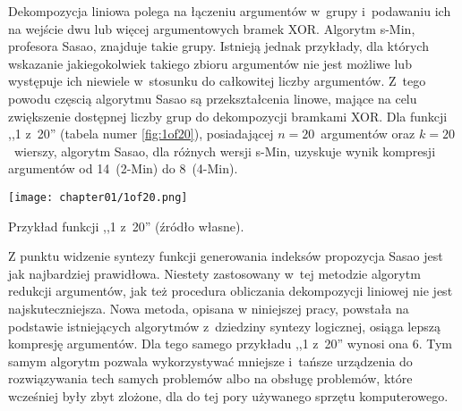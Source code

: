 Dekompozycja liniowa polega na łączeniu argumentów w~grupy i~podawaniu ich na wejście dwu lub więcej argumentowych bramek XOR.
Algorytm s-Min, profesora Sasao, znajduje takie grupy.
Istnieją jednak przykłady,
dla których wskazanie jakiegokolwiek takiego zbioru argumentów nie jest możliwe lub występuje ich niewiele w~stosunku do całkowitej liczby argumentów.
Z~tego powodu częscią algorytmu Sasao są przekształcenia linowe,
mające na celu zwiększenie dostępnej liczby grup do dekompozycji bramkami XOR.
Dla funkcji ,,1 z~20'' (tabela numer \ref{fig:1of20}),
posiadającej $n=20$~argumentów oraz $k=20$~wierszy,
algorytm Sasao,
dla różnych wersji s-Min,
uzyskuje wynik kompresji argumentów od 14~(2-Min) do 8~(4-Min).

\begin{table}
\centering
\texttt{[image: chapter01/1of20.png]}
\caption{Przykład funkcji ,,1 z~20'' (źródło własne).}
\label{fig:1of20}
\end{table}

Z punktu widzenie syntezy funkcji generowania indeksów propozycja Sasao jest jak najbardziej prawidłowa.
Niestety zastosowany w~tej metodzie algorytm redukcji argumentów,
jak też procedura obliczania dekompozycji liniowej nie jest najskuteczniejsza.
Nowa metoda,
opisana w niniejszej pracy,
powstała na podstawie istniejących algorytmów z~dziedziny syntezy logicznej,
osiąga lepszą kompresję argumentów.
Dla tego samego przykładu ,,1 z~20'' wynosi ona 6.
Tym samym algorytm pozwala wykorzystywać mniejsze i~tańsze urządzenia do rozwiązywania tech samych problemów
albo na obsługę problemów, które wcześniej były zbyt zlożone,
dla do tej pory używanego sprzętu komputerowego.



